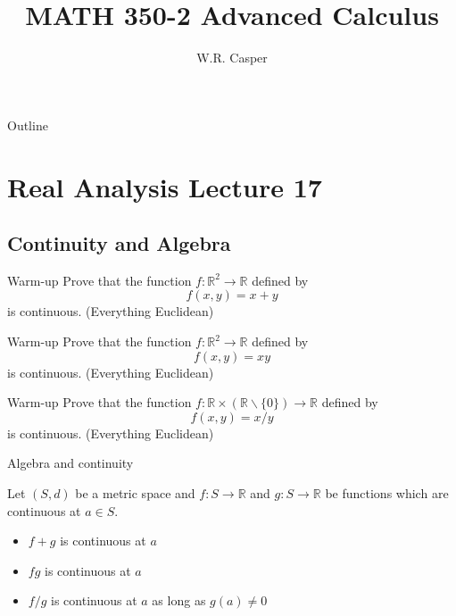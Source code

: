 \documentclass{beamer}
\title{MATH 350-2 Advanced Calculus}
\subtitle
{} %
\author[W.R. Casper] %
{W.R. Casper}
\institute[California State University Fullerton] %
{
  Department of Mathematics\\
  California State University Fullerton}
\begin{document}
\begin{frame}
  \titlepage
\end{frame}

\begin{frame}{Outline}
  \tableofcontents
\end{frame}



\section{Real Analysis Lecture 17}

\subsection{Continuity and Algebra}

\begin{frame}{Warm-up}
Prove that the function $f: \mathbb R^2\rightarrow\mathbb R$ defined by
$$f(x,y) = x+y$$
is continuous. (Everything Euclidean)
\end{frame}

\begin{frame}{Warm-up}
Prove that the function $f: \mathbb R^2\rightarrow\mathbb R$ defined by
$$f(x,y) = xy$$
is continuous. (Everything Euclidean)
\end{frame}

\begin{frame}{Warm-up}
Prove that the function $f: \mathbb R \times (\mathbb R\backslash\{0\})\rightarrow\mathbb R$ defined by
$$f(x,y) = x/y$$
is continuous. (Everything Euclidean)
\end{frame}

\begin{frame}{Algebra and continuity}
\begin{thm}
Let $(S,d)$ be a metric space and $f: S\rightarrow \mathbb{R}$ and $g: S\rightarrow\mathbb{R}$ be functions which are continuous at $a\in S$.
\begin{itemize}
\item $f+g$ is continuous at $a$
\item $fg$ is continuous at $a$
\item $f/g$ is continuous at $a$ as long as $g(a)\neq 0$
\end{itemize}
\end{thm}
\end{frame}
\end{document}
